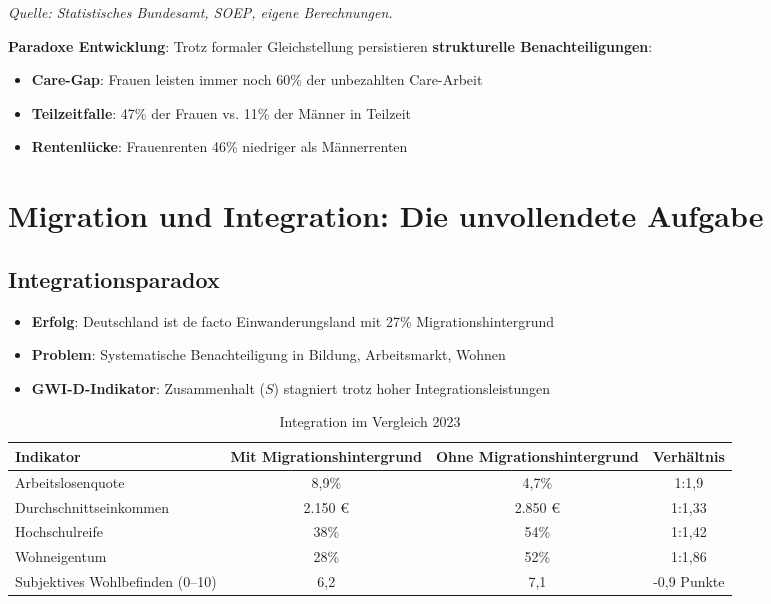 \begin{flushleft}
\footnotesize{\textit{Quelle: Statistisches Bundesamt, SOEP, eigene Berechnungen.}}
\end{flushleft}

\textbf{Paradoxe Entwicklung}: Trotz formaler Gleichstellung persistieren \textbf{strukturelle Benachteiligungen}:
\begin{itemize}
    \item \textbf{Care-Gap}: Frauen leisten immer noch 60\% der unbezahlten Care-Arbeit
    \item \textbf{Teilzeitfalle}: 47\% der Frauen vs. 11\% der Männer in Teilzeit
    \item \textbf{Rentenlücke}: Frauenrenten 46\% niedriger als Männerrenten
\end{itemize}

\section{Migration und Integration: Die unvollendete Aufgabe}

\subsection{Integrationsparadox}

\begin{itemize}
    \item \textbf{Erfolg}: Deutschland ist de facto Einwanderungsland mit 27\% Migrationshintergrund
    \item \textbf{Problem}: Systematische Benachteiligung in Bildung, Arbeitsmarkt, Wohnen
    \item \textbf{GWI-D-Indikator}: Zusammenhalt (\(S\)) stagniert trotz hoher Integrationsleistungen
\end{itemize}

\begin{table}[ht]
    \centering
    \caption{Integration im Vergleich 2023}
    \label{tab:integration}
    \begin{tabular}{lccc}
        \toprule
        \textbf{Indikator} & \textbf{Mit Migrationshintergrund} & \textbf{Ohne Migrationshintergrund} & \textbf{Verhältnis} \\
        \midrule
        Arbeitslosenquote & 8,9\% & 4,7\% & 1:1,9 \\
        Durchschnittseinkommen & 2.150 € & 2.850 € & 1:1,33 \\
        Hochschulreife & 38\% & 54\% & 1:1,42 \\
        Wohneigentum & 28\% & 52\% & 1:1,86 \\
        Subjektives Wohlbefinden (0–10) & 6,2 & 7,1 & -0,9 Punkte \\
        \bottomrule
    \end{tabular}
\end{table}

